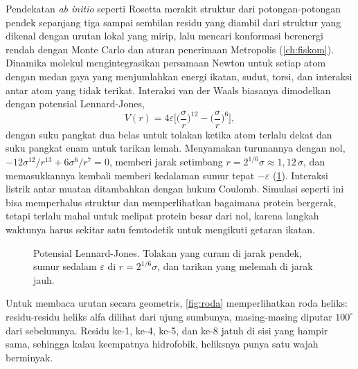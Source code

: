 Pendekatan \emph{ab initio} seperti Rosetta merakit struktur dari potongan-potongan pendek sepanjang tiga sampai sembilan residu
yang diambil dari struktur yang dikenal dengan urutan lokal yang mirip, lalu mencari konformasi berenergi rendah dengan Monte
Carlo dan aturan penerimaan Metropolis (\cref{ch:fiskom}). Dinamika molekul mengintegrasikan persamaan Newton untuk setiap atom
dengan medan gaya yang menjumlahkan energi ikatan, sudut, torsi, dan interaksi antar atom yang tidak terikat. Interaksi van der
Waals biasanya dimodelkan dengan potensial Lennard-Jones,
\begin{equation}
V(r)=4\varepsilon\Big[\Big(\frac\sigma r\Big)^{12}-\Big(\frac\sigma r\Big)^{6}\Big],
\end{equation}
dengan suku pangkat dua belas untuk tolakan ketika atom terlalu dekat dan suku pangkat enam untuk tarikan lemah. Menyamakan
turunannya dengan nol, $-12\sigma^{12}/r^{13}+6\sigma^6/r^7=0$, memberi jarak setimbang $r=2^{1/6}\sigma\approx1{,}12\,\sigma$,
dan memasukkannya kembali memberi kedalaman sumur tepat $-\varepsilon$ (\cref{fig:lj}). Interaksi listrik antar muatan ditambahkan dengan hukum
Coulomb. Simulasi seperti ini bisa memperhalus struktur dan memperlihatkan bagaimana protein bergerak, tetapi terlalu mahal untuk
melipat protein besar dari nol, karena langkah waktunya harus sekitar satu femtodetik untuk mengikuti getaran ikatan.

\begin{figure}[ht]
\centering
{}
\caption{Potensial Lennard-Jones. Tolakan yang curam di jarak pendek, sumur sedalam $\varepsilon$ di $r=2^{1/6}\sigma$,
dan tarikan yang melemah di jarak jauh.}
\label{fig:lj}
\end{figure}

Untuk membaca urutan secara geometris, \cref{fig:roda} memperlihatkan roda heliks: residu-residu heliks alfa dilihat dari
ujung sumbunya, masing-masing diputar $100^\circ$ dari sebelumnya. Residu ke-1, ke-4, ke-5, dan ke-8 jatuh di sisi yang
hampir sama, sehingga kalau keempatnya hidrofobik, heliksnya punya satu wajah berminyak.

